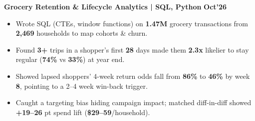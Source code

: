 \textbf{Grocery Retention \& Lifecycle Analytics | SQL, Python} \hfill \textbf{Oct'26} \\
\vspace{-3pt}
\begin{itemize}[leftmargin=0.15in]
    \item Wrote SQL (CTEs, window functions) on \textbf{1.47M} grocery transactions from \textbf{2,469} households to map cohorts \& churn.
    \item Found \textbf{3+} trips in a shopper's first \textbf{28} days made them \textbf{2.3x} likelier to stay regular (\textbf{74\%} vs \textbf{33\%}) at year end.
    \item Showed lapsed shoppers' 4-week return odds fall from \textbf{86\%} to \textbf{46\%} by week \textbf{8}, pointing to a 2--4 week win-back trigger.
    \item Caught a targeting bias hiding campaign impact; matched diff-in-diff showed \textbf{+19--26} pt spend lift (\textbf{\$29--59}/household).
\end{itemize}
\vspace{-4pt}
